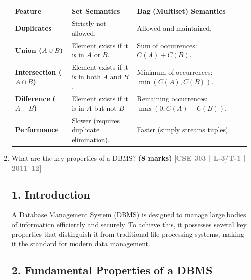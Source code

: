 \documentclass[12pt,a3paper]{article}
\newcommand{\yr}[1]{\hfill\textcolor{gray}{\small\textbf{[#1]}}}
\newcommand{\mk}[1]{\textcolor{orange!70!black}{\small\textbf{(#1 marks)}}}
\begin{document}
\begin{enumerate}
\begin{tcolorbox}[enhanced,breakable,ansbox,colback=cA!4,colframe=cA,boxrule=0.8pt,arc=5pt,title={\textbf{Answer}},fonttitle=\bfseries\color{white},colbacktitle=cA]
\begin{center}
\renewcommand{\arraystretch}{1.4}
\begin{tabularx}{\textwidth}{@{} >{\bfseries}l X X @{}}
\toprule
Feature & Set Semantics & Bag (Multiset) Semantics \\
\midrule
\textbf{Duplicates} & Strictly not allowed. & Allowed and maintained. \\
\textbf{Union ($A \cup B$)} & Element exists if it is in $A$ or $B$. & Sum of occurrences: $C(A) + C(B)$. \\
\textbf{Intersection ($A \cap B$)} & Element exists if it is in both $A$ and $B$. & Minimum of occurrences: $\min(C(A), C(B))$. \\
\textbf{Difference ($A - B$)} & Element exists if it is in $A$ but not $B$. & Remaining occurrences: $\max(0, C(A) - C(B))$. \\
\textbf{Performance} & Slower (requires duplicate elimination). & Faster (simply streams tuples). \\
\bottomrule
\end{tabularx}
\end{center}

\end{tcolorbox}

\item What are the key properties of a DBMS?
\mk{8} \yr{CSE 303 | L-3/T-1 | 2011--12}

\begin{tcolorbox}[enhanced,breakable,ansbox,colback=cA!4,colframe=cA,boxrule=0.8pt,arc=5pt,title={\textbf{Answer}},fonttitle=\bfseries\color{white},colbacktitle=cA]

\subsection*{1. Introduction}
A Database Management System (DBMS) is designed to manage large bodies of information efficiently and securely. To achieve this, it possesses several key properties that distinguish it from traditional file-processing systems, making it the standard for modern data management.

\subsection*{2. Fundamental Properties of a DBMS}


\end{tcolorbox}
\end{enumerate}
\end{document}
